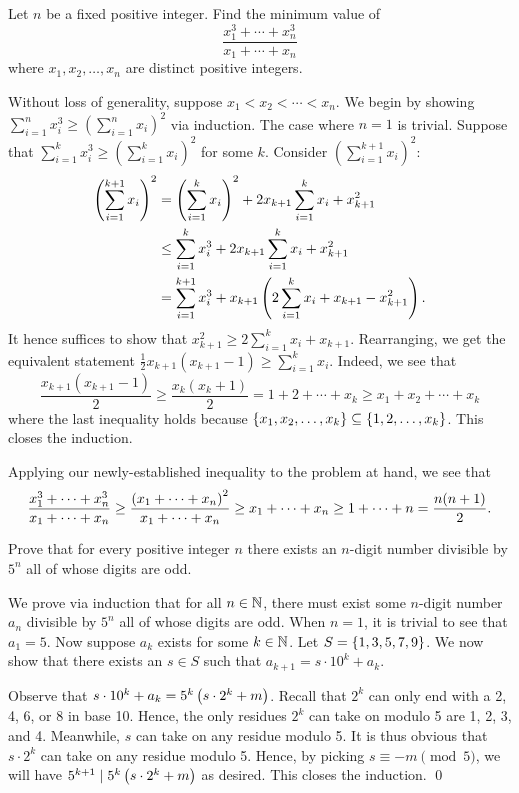 \begin{question}[$\frac12 n{(n+1)}$]\label{Q::2024-O-2-2}
    Let $n$ be a fixed positive integer. Find the minimum value of \[\frac{x_1^3 + \cdots + x_n^3}{x_1 + \cdots + x_n}\] where $x_1, x_2, \ldots, x_n$ are distinct positive integers.
\end{question}
\begin{solution*}
    Without loss of generality, suppose $x_1 < x_2 < \cdots < x_n$. We begin by showing $\sum_{i=1}^{n} x_i^3 \geq (\sum_{i=1}^n x_i)^2$ via induction. The case where $n = 1$ is trivial. Suppose that $\sum_{i=1}^{k} x_i^3 \geq (\sum_{i=1}^k x_i)^2$ for some $k$. Consider $(\sum_{i=1}^{k+1} x_i)^2$:
    \begin{align*}
        \left( \sum_{i=1}^{k+1} x_i \right)^2 &= \left( \sum_{i=1}^{k} x_i \right)^2 + 2x_{k+1}\sum_{i=1}^{k} x_i + x_{k+1}^2\\
        &\leq \sum_{i=1}^{k} x_i^3 + 2x_{k+1}\sum_{i=1}^{k} x_i + x_{k+1}^2\\
        &= \sum_{i=1}^{k+1} x_i^3 + x_{k+1} \left( 2\sum_{i=1}^{k} x_i + x_{k+1} - x_{k+1}^2 \right).
    \end{align*}
    It hence suffices to show that $x_{k+1}^2 \geq 2\sum_{i=1}^{k} x_i + x_{k+1}$. Rearranging, we get the equivalent statement $\frac12 x_{k+1} (x_{k+1} - 1) \geq \sum_{i=1}^k x_i$. Indeed, we see that \[\frac{x_{k+1}(x_{k+1} - 1)}2 \geq \frac{x_k (x_k + 1)}2 = 1 + 2 + \cdots + x_k \geq x_1 + x_2 + \cdots + x_k\] where the last inequality holds because $\left\lbrace x_1, x_2, \ldots, x_k \right\rbrace \subseteq \left\lbrace 1, 2, \ldots, x_k \right\rbrace$. This closes the induction.
    
    Applying our newly-established inequality to the problem at hand, we see that \[\frac{x_1^3 + \cdots + x_n^3}{x_1 + \cdots + x_n} \geq \frac{\left( x_1 + \cdots + x_n \right)^2}{x_1 + \cdots + x_n} \geq x_1 + \cdots + x_n \geq 1 + \cdots + n = \frac{n(n+1)}2.\]    
\end{solution*}

\begin{question}\label{Q::2024-O-2-3}
    Prove that for every positive integer $n$ there exists an $n$-digit number divisible by $5^n$ all of whose digits are odd.
\end{question}
\begin{solution*}
    We prove via induction that for all $n \in \mathbb{N}$, there must exist some $n$-digit number $a_n$  divisible by $5^n$ all of whose digits are odd. When $n = 1$, it is trivial to see that $a_1 = 5$. Now suppose $a_k$ exists for some $k \in \mathbb{N}$. Let $S = \left\lbrace 1, 3, 5, 7, 9 \right\rbrace$. We now show that there exists an $s \in S$ such that $a_{k+1} = s \cdot 10^k + a_k$.

    Observe that $s \cdot 10^k + a_k = 5^k \left( s \cdot 2^k + m \right)$. Recall that $2^k$ can only end with a 2, 4, 6, or 8 in base 10. Hence, the only residues $2^k$ can take on modulo 5 are 1, 2, 3, and 4. Meanwhile, $s$ can take on any residue modulo 5. It is thus obvious that $s \cdot 2^k$ can take on any residue modulo 5. Hence, by picking $s \equiv -m \pmod{5}$, we will have $5^{k+1} \mid 5^k \left( s \cdot 2^k + m \right)$ as desired. This closes the induction. \qed
\end{solution*}

